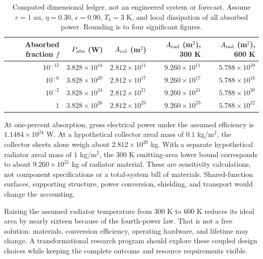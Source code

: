 \documentclass[11pt,letterpaper]{article}
\newcommand{\1}{\mathbf 1}
\theoremstyle{remark}\newtheorem{remark}{Remark}[section]
\begin{document}
\begin{table}[htbp]\centering\small
\caption{Computed dimensional ledger, not an engineered system or forecast. Assume $r=1$ au, $\eta=0.30$, $\epsilon=0.90$, $T_b=3$ K, and local dissipation of all absorbed power. Rounding is to four significant figures.}
\begin{tabular}{@{}rrrrr@{}}\toprule
Absorbed fraction $f$ & $P_{\rm abs}$ (W) & $A_{\rm col}$ (m$^2$) & $A_{\rm rad}$ (m$^2$), 300 K & $A_{\rm rad}$ (m$^2$), 600 K\\\midrule
$10^{-12}$ & $3.828\times10^{14}$ & $2.812\times10^{11}$ & $9.260\times10^{11}$ & $5.788\times10^{10}$\\
$10^{-6}$ & $3.828\times10^{20}$ & $2.812\times10^{17}$ & $9.260\times10^{17}$ & $5.788\times10^{16}$\\
$10^{-2}$ & $3.828\times10^{24}$ & $2.812\times10^{21}$ & $9.260\times10^{21}$ & $5.788\times10^{20}$\\
$1$ & $3.828\times10^{26}$ & $2.812\times10^{23}$ & $9.260\times10^{23}$ & $5.788\times10^{22}$\\\bottomrule
\end{tabular}\label{tab:stellar}
\end{table}

At one-percent absorption, gross electrical power under the assumed efficiency is $1.1484\times10^{24}$ W. At a hypothetical collector areal mass of $0.1$ kg/m$^2$, the collector sheets alone weigh about $2.812\times10^{20}$ kg. With a separate hypothetical radiator areal mass of $1$ kg/m$^2$, the 300 K emitting-area lower bound corresponds to about $9.260\times10^{21}$ kg of radiator material. These are sensitivity calculations, not component specifications or a total-system bill of materials. Shared-function surfaces, supporting structure, power conversion, shielding, and transport would change the accounting.

Raising the assumed radiator temperature from 300 K to 600 K reduces its ideal area by nearly sixteen because of the fourth-power law. That is not a free solution: materials, conversion efficiency, operating hardware, and lifetime may change. A transformational research program should explore these coupled design choices while keeping the complete outcome and resource requirements visible.
\end{document}
